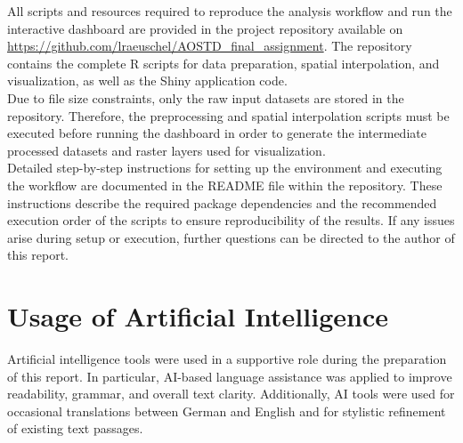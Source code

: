 \documentclass[manuscript,nonacm]{acmart}
\begin{document}
All scripts and resources required to reproduce the analysis workflow and run the interactive dashboard are provided in the project repository available on \url{https://github.com/lraeuschel/AOSTD_final_assignment}. The repository contains the complete R scripts for data preparation, spatial interpolation, and visualization, as well as the Shiny application code.\\
Due to file size constraints, only the raw input datasets are stored in the repository. Therefore, the preprocessing and spatial interpolation scripts must be executed before running the dashboard in order to generate the intermediate processed datasets and raster layers used for visualization.\\
Detailed step-by-step instructions for setting up the environment and executing the workflow are documented in the README file within the repository. These instructions describe the required package dependencies and the recommended execution order of the scripts to ensure reproducibility of the results. If any issues arise during setup or execution, further questions can be directed to the author of this report.

\section{Usage of Artificial Intelligence}

Artificial intelligence tools were used in a supportive role during the preparation of this report. In particular, AI-based language assistance was applied to improve readability, grammar, and overall text clarity. Additionally, AI tools were used for occasional translations between German and English and for stylistic refinement of existing text passages.







\end{document}
